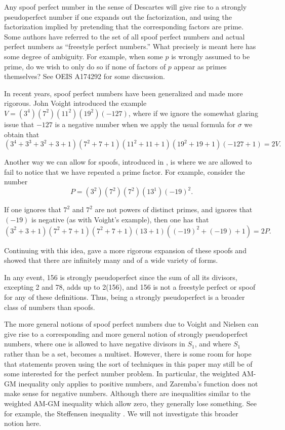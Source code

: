\documentclass{article}
\begin{document}
Any spoof perfect number in the sense of Descartes will give rise to a strongly pseudoperfect number if one expands out the factorization, and using the factorization implied by pretending that the corresponding factors are prime. Some authors have referred to the set of all spoof perfect numbers and actual perfect numbers as ``freestyle perfect numbers.''  What precisely is meant here has some degree of ambiguity. For example, when some $p$ is wrongly assumed to be prime, do we wish to only do so if none of factors of $p$ appear as primes themselves? See OEIS A174292 for some discussion. 

In recent years, spoof perfect numbers have been generalized and made more rigorous. John Voight introduced the example $V=(3^4)(7^2)(11^2)(19^2)(-127)$, where if we ignore the somewhat glaring issue that $-127$ is a negative number when we apply the usual formula for $\sigma$ we obtain that
$$(3^4+3^3+3^2+3+1)(7^2+7+1)(11^2+11+1)(19^2+19+1)(-127+1) = 2V.$$

Another way we can allow for spoofs, introduced in  \cite{BYU}, is where we are allowed to fail to notice that we have repeated a prime factor. For example, consider the number $$P=(3^2)(7^2)(7^2)(13^1)(-19)^2.$$

If one ignores that $7^2$ and $7^2$ are not powers of distinct primes, and ignores that $(-19)$ is negative (as with Voight's example), then one has that
$$(3^2+3+1)(7^2+7+1)(7^2+7+1)(13+1)((-19)^2 + (-19)+1)= 2P.$$ 

Continuing with this idea, \cite{BYU} gave a more rigorous expansion of these spoofs and showed that there are infinitely many and of a wide variety of forms. 

In any event, 156 is strongly pseudoperfect since the sum of all its divisors, excepting 2 and 78, adds up to 2(156), and 156 is not a freestyle perfect or spoof for any of these definitions. Thus,  being a strongly pseudoperfect is a broader class of numbers than spoofs.

The more general notions of spoof perfect numbers due to Voight and Nielsen can give rise to a corresponding and more general notion of strongly pseudoperfect numbers, where one is allowed to have negative divisors in $S_1$, and where $S_1$ rather than be a set, becomes a multiset. However, there is some room for hope that statements proven using the sort of techniques in this paper may still be of some interested for the perfect number problem. In particular, the weighted AM-GM inequality only applies to positive numbers, and Zaremba's function does not make sense for negative numbers. Although there are inequalities similar to the weighted AM-GM inequality which allow zero, they generally lose something. See for example, the Steffensen inequality \cite{Steffensen}. We will not investigate this broader notion here.
\end{document}
